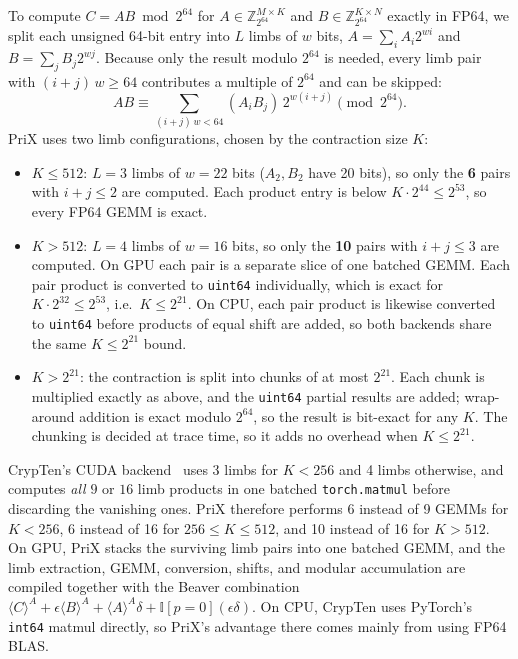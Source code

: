 \documentclass[11pt]{article}
\newcommand{\shareA}[1]{\langle #1 \rangle^{A}}
\newcommand{\Zring}{\mathbb{Z}_{2^{64}}}
\begin{document}
To compute $C = A B \bmod 2^{64}$ for $A \in \Zring^{M \times K}$ and $B \in \Zring^{K \times N}$ exactly in FP64, we split each unsigned 64-bit entry into $L$ limbs of $w$ bits, $A = \sum_{i} A_i 2^{wi}$ and $B = \sum_j B_j 2^{wj}$. Because only the result modulo $2^{64}$ is needed, every limb pair with $(i + j)\,w \ge 64$ contributes a multiple of $2^{64}$ and can be skipped:
\begin{equation}
    A B \equiv \sum_{(i + j)\,w < 64} (A_i B_j) \, 2^{w(i + j)} \pmod{2^{64}}.
    \label{eq:ten_limbs}
\end{equation}
PriX uses two limb configurations, chosen by the contraction size $K$:
\begin{itemize}
    \item $K \le 512$: $L = 3$ limbs of $w = 22$ bits ($A_2, B_2$ have 20 bits), so only the \textbf{6} pairs with $i + j \le 2$ are computed. Each product entry is below $K \cdot 2^{44} \le 2^{53}$, so every FP64 GEMM is exact.
    \item $K > 512$: $L = 4$ limbs of $w = 16$ bits, so only the \textbf{10} pairs with $i + j \le 3$ are computed. On GPU each pair is a separate slice of one batched GEMM. Each pair product is converted to \texttt{uint64} individually, which is exact for $K \cdot 2^{32} \le 2^{53}$, i.e.\ $K \le 2^{21}$. On CPU, each pair product is likewise converted to \texttt{uint64} before products of equal shift are added, so both backends share the same $K \le 2^{21}$ bound.
    \item $K > 2^{21}$: the contraction is split into chunks of at most $2^{21}$. Each chunk is multiplied exactly as above, and the \texttt{uint64} partial results are added; wrap-around addition is exact modulo $2^{64}$, so the result is bit-exact for any $K$. The chunking is decided at trace time, so it adds no overhead when $K \le 2^{21}$.
\end{itemize}
CrypTen's CUDA backend~\cite{knott2021crypten} uses 3 limbs for $K < 256$ and 4 limbs otherwise, and computes \emph{all} $9$ or $16$ limb products in one batched \texttt{torch.matmul} before discarding the vanishing ones. PriX therefore performs 6 instead of 9 GEMMs for $K < 256$, 6 instead of 16 for $256 \le K \le 512$, and 10 instead of 16 for $K > 512$. On GPU, PriX stacks the surviving limb pairs into one batched GEMM, and the limb extraction, GEMM, conversion, shifts, and modular accumulation are compiled together with the Beaver combination $\shareA{C} + \epsilon \shareA{B} + \shareA{A}\delta + \mathbb{I}[p=0](\epsilon\delta)$. On CPU, CrypTen uses PyTorch's \texttt{int64} matmul directly, so PriX's advantage there comes mainly from using FP64 BLAS.
\end{document}
